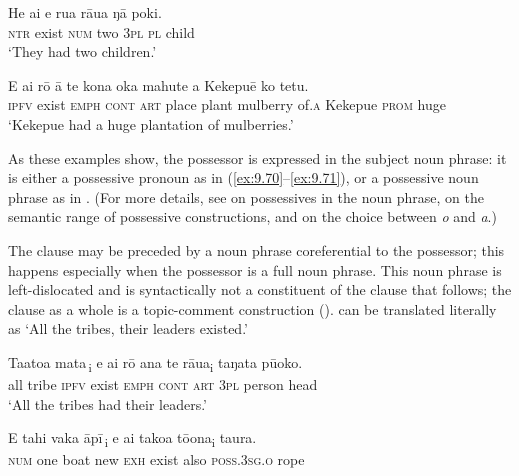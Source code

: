 \ea\label{ex:9.71}
\gll He ai e rua rāua ŋā poki. \\
\textsc{ntr} exist \textsc{num} two \textsc{3pl} \textsc{pl} child \\

\glt 
‘They had two children.’ \textstyleExampleref{[R211.002]} 
\z

\ea\label{ex:9.72}
\gll E ai rō {\ꞌ}ā te kona {\ꞌ}oka mahute {\ꞌ}a Kekepuē ko tetu.\\
\textsc{ipfv} exist \textsc{emph} \textsc{cont} \textsc{art} place plant mulberry of\textsc{.a} Kekepue \textsc{prom} huge\\

\glt
‘Kekepue had a huge plantation of mulberries.’ \textstyleExampleref{[Fel-1978.008]}
\z

As these examples show, the possessor is expressed in the subject noun phrase: it is either a possessive pronoun as in (\ref{ex:9.70}–\ref{ex:9.71}), or a possessive noun phrase as in . (For more details, see  on possessives in the noun phrase,  on the semantic range of possessive constructions, and  on the choice between \textit{o} and \textit{{\ꞌ}a}.)

The clause may be preceded by a noun phrase coreferential to the possessor; this happens especially when the possessor is a full noun phrase. This noun phrase is left-dislocated and is syntactically not a constituent of the clause that follows; the clause as a whole is a topic-comment construction ().  can be translated literally as ‘All the tribes, their leaders existed.’

\ea\label{ex:9.73}
\gll {\ob}Ta{\ꞌ}ato{\ꞌ}a mata\,{\cb}\textsubscript{\textup{i}} e ai rō {\ꞌ}ana te rāua\textsubscript{\textup{i}} taŋata pū{\ꞌ}oko. \\
{\db}all tribe \textsc{ipfv} exist \textsc{emph} \textsc{cont} \textsc{art} \textsc{3pl} person head \\

\glt 
‘All the tribes had their leaders.’ \textstyleExampleref{[R371.006]} 
\z

\ea\label{ex:9.74}
\gll {\ob}E tahi vaka {\ꞌ}āpī\,{\cb}\textsubscript{\textup{i}} e ai tako{\ꞌ}a tō{\ꞌ}ona\textsubscript{\textup{i}} taura. \\
{\db}\textsc{num} one boat new \textsc{exh} exist also \textsc{poss.3sg.o} rope \\

